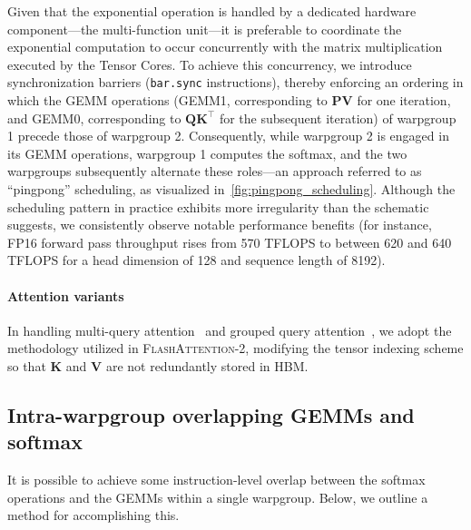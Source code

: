Given that the exponential operation is handled by a dedicated hardware component—the multi-function unit—it is preferable to coordinate the exponential computation to occur concurrently with the matrix multiplication executed by the Tensor Cores. To achieve this concurrency, we introduce synchronization barriers (\texttt{bar.sync} instructions), thereby enforcing an ordering in which the GEMM operations (GEMM1, corresponding to $\mathbf{P} \mathbf{V}$ for one iteration, and GEMM0, corresponding to $\mathbf{Q} \mathbf{K}^\top$ for the subsequent iteration) of warpgroup 1 precede those of warpgroup 2. Consequently, while warpgroup 2 is engaged in its GEMM operations, warpgroup 1 computes the softmax, and the two warpgroups subsequently alternate these roles—an approach referred to as ``pingpong'' scheduling, as visualized in~\cref{fig:pingpong_scheduling}. Although the scheduling pattern in practice exhibits more irregularity than the schematic suggests, we consistently observe notable performance benefits (for instance, FP16 forward pass throughput rises from 570 TFLOPS to between 620 and 640 TFLOPS for a head dimension of 128 and sequence length of 8192).

\paragraph{Attention variants} In handling multi-query attention~\citep{shazeer2019fast} and grouped query attention~\citep{ainslie2023gqa}, we adopt the methodology utilized in \textsc{FlashAttention-2}, modifying the tensor indexing scheme so that $\mathbf{K}$ and $\mathbf{V}$ are not redundantly stored in HBM.

\subsection{Intra-warpgroup overlapping GEMMs and softmax}

It is possible to achieve some instruction-level overlap between the softmax operations and the GEMMs within a single warpgroup. Below, we outline a method for accomplishing this.

